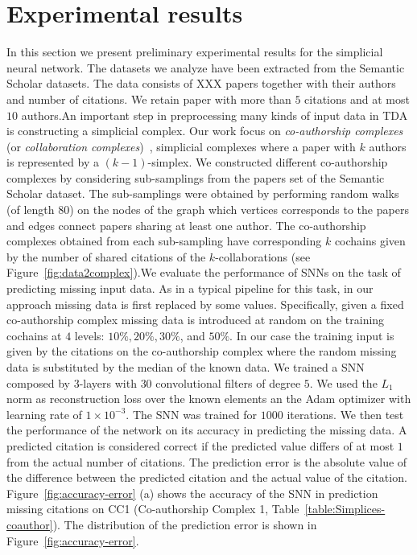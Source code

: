 \section{Experimental results}
In this section we present preliminary experimental results for the simplicial neural network. The datasets we analyze have been extracted from the Semantic Scholar datasets. The data consists of XXX papers together with their authors and number of citations. We retain paper with more than $5$ citations and at most $10$ authors.An important step in preprocessing many kinds of input data in TDA is constructing a simplicial complex. Our work focus on \emph{co-authorship complexes} (or \emph{collaboration complexes})~\cite{patania2017}, simplicial complexes where a paper with $k$ authors is represented by a $(k-1)$-simplex. We constructed different co-authorship complexes by considering sub-samplings from the papers set of the Semantic Scholar dataset. The sub-samplings were obtained by performing random walks (of length 80) on the nodes of the graph which vertices corresponds to the papers and edges connect papers sharing at least one author. The co-authorship complexes obtained from each sub-sampling  have corresponding $k$ cochains given by the number of shared citations of the $k$-collaborations (see Figure~\ref{fig:data2complex}).We evaluate the performance of SNNs on the task of predicting missing input data. As in a typical pipeline for this task, in our approach missing data is first replaced by some values. Specifically, given a fixed co-authorship complex missing data is introduced 
at random on the training cochains at $4$ levels: $10\%,  20\%,  30\%$, and $50\% $.   In our case the training input is given by the citations on the co-authorship complex where the random missing data is substituted by the median of the known data. We trained a SNN composed by $3$-layers with $30$ convolutional filters of degree $5$. We used the $L_1$ norm as reconstruction loss over the known elements an the Adam optimizer with learning rate of $1\times 10^{-3}$. The SNN was trained for $1000$ iterations. We then test the performance of the network on its accuracy in predicting the missing data. A predicted citation is considered correct if the predicted value differs of at most $1$ from the actual number of citations. The prediction error is the absolute value of the difference between the predicted citation and the actual value of the citation. Figure~\ref{fig:accuracy-error} (a) shows the accuracy of the SNN in prediction missing citations on CC1 (Co-authorship Complex 1, Table~\ref{table:Simplices-coauthor}). The distribution of the prediction error is shown in Figure~\ref{fig:accuracy-error}. 
